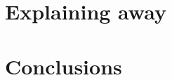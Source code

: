 \documentclass[12pt]{report}
\begin{document}
    \chapter{Explaining away}
    
    
    \chapter{Conclusions}
    

    




    
    
\end{document}

